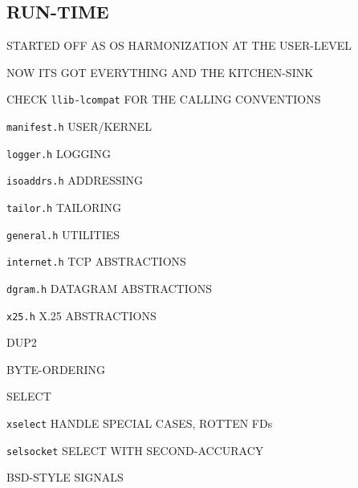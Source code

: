 \begin{bwslide}
\part*	{RUN-TIME}\bf

\begin{nrtc}
\item	STARTED OFF AS OS HARMONIZATION AT THE USER-LEVEL

\item	NOW ITS GOT EVERYTHING AND THE KITCHEN-SINK

\item	CHECK \verb"llib-lcompat" FOR THE CALLING CONVENTIONS
\end{nrtc}
\end{bwslide}


\begin{bwslide}

\begin{nrtc}
\item	\verb"manifest.h" USER/KERNEL

\item	\verb"logger.h" LOGGING

\item	\verb"isoaddrs.h" ADDRESSING

\item	\verb"tailor.h" TAILORING

\item	\verb"general.h" UTILITIES

\item	\verb"internet.h" TCP ABSTRACTIONS

\item	\verb"dgram.h" DATAGRAM ABSTRACTIONS

\item	\verb"x25.h" X.25 ABSTRACTIONS
\end{nrtc}
\end{bwslide}


\begin{bwslide}

\begin{nrtc}
\item	DUP2

\item	BYTE-ORDERING

\item	SELECT
    \begin{nrtc}
    \item	\verb"xselect" HANDLE SPECIAL CASES, ROTTEN FDs

    \item	\verb"selsocket" SELECT WITH SECOND-ACCURACY
    \end{nrtc}

\item	BSD-STYLE SIGNALS
\end{nrtc}
\end{bwslide}


